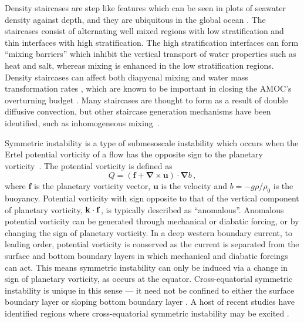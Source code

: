 Density staircases are step like features which can be seen in plots of seawater density against depth, and they are ubiquitous in the global ocean \citep{Stern1960,Schmitt1987,Melling1984,Tait1968,Johannessen1974,Lambert1977}. The staircases consist of alternating well mixed regions with low stratification and thin interfaces with high stratification. The high stratification interfaces can form ``mixing barriers'' which inhibit the vertical transport of water properties such as heat and salt, whereas mixing is enhanced in the low stratification regions. Density staircases can affect both diapycnal mixing and water mass transformation rates \citep{Schmitt2005}, which are known to be important in closing the AMOC's overturning budget \citep{DeLavergne2022}. Many staircases are thought to form as a result of double diffusive convection, but other staircase generation mechanisms have been identified, such as inhomogeneous mixing~\citep{Balmforth1998}.

Symmetric instability is a type of submesoscale instability which occurs when the Ertel potential vorticity of a flow has the opposite sign to the planetary vorticity~\citep{Stone1966, Hoskins1974}.  The potential vorticity is defined as
\begin{equation}
    Q = (\mathbf{f} + \mathbf{\nabla} \times \mathbf{u}) \cdot \mathbf{\nabla}b \, ,
\end{equation}
where $\mathbf{f}$ is the planetary vorticity vector, $\mathbf{u}$ is the velocity and $b = - g \rho / \rho_0$ is the buoyancy. Potential vorticity with sign opposite to that of the vertical component of planetary vorticity, ${\bf k} \cdot {\bf f}$, is typically described as ``anomalous''. Anomalous potential vorticity can be generated through mechanical or diabatic forcing, or by changing the sign of planetary vorticity. In a deep western boundary current, to leading order, potential vorticity is conserved as the current is separated from the surface and bottom boundary layers in which mechanical and diabatic forcings can act. This means symmetric instability can only be induced via a change in sign of planetary vorticity, as occurs at the equator. Cross-equatorial symmetric instability is unique in this sense --- it need not be confined to either the surface boundary layer or sloping bottom boundary layer \citep{Haine1998, Wenegrat2020}. A host of recent studies have identified regions where cross-equatorial symmetric instability may be excited \citep{Jakoboski2022, Goldsworth2021, Forryan2021, Zhou2022}.

